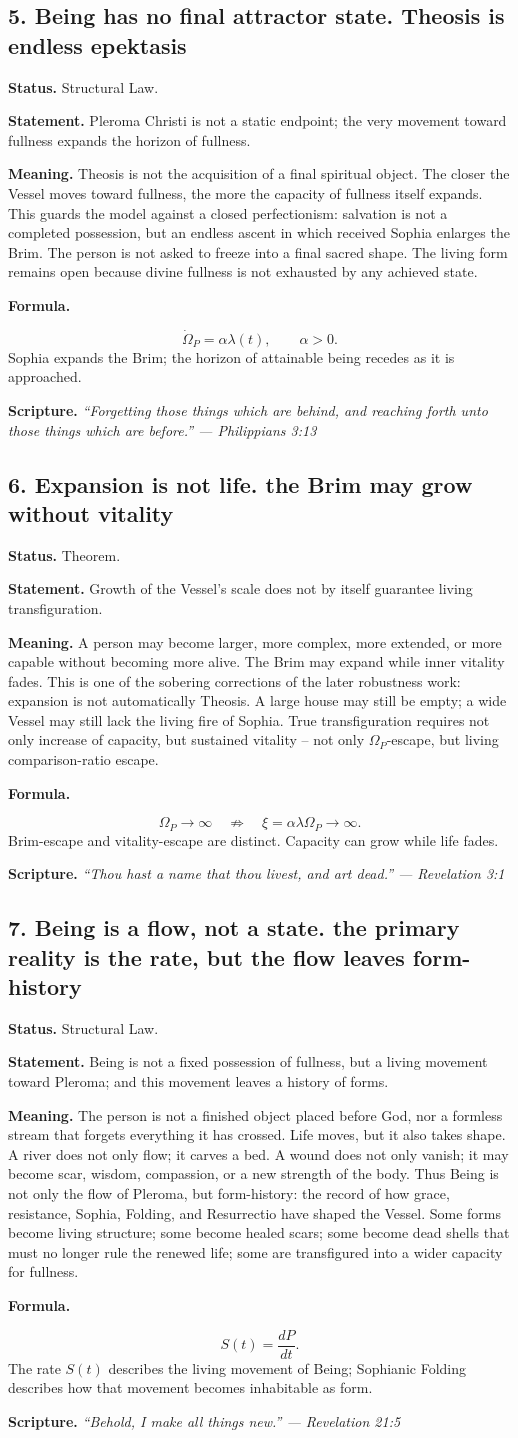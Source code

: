 \documentclass[11pt]{article}
\newcommand{\Op}{\Omega_P}
\newcommand{\thesis}[2]{%
  \subsection*{#1. #2}%
}
\newcommand{\status}[1]{\textbf{Status.} #1\par}
\newcommand{\statement}[1]{\textbf{Statement.} #1\par}
\newcommand{\explain}[1]{\textbf{Meaning.} #1\par}
\newcommand{\formula}[1]{\textbf{Formula.}\par #1\par}
\newcommand{\scripture}[2]{\textbf{Scripture.} {\small\itshape ``#1'' --- #2}\par}
\begin{document}
\thesis{5}{Being has no final attractor state. Theosis is endless epektasis}
\status{Structural Law.}
\statement{Pleroma Christi is not a static endpoint; the very movement toward fullness expands the horizon of fullness.}
\explain{Theosis is not the acquisition of a final spiritual object. The closer the Vessel moves toward fullness, the more the capacity of fullness itself expands. This guards the model against a closed perfectionism: salvation is not a completed possession, but an endless ascent in which received Sophia enlarges the Brim. The person is not asked to freeze into a final sacred shape. The living form remains open because divine fullness is not exhausted by any achieved state.}
\formula{\[
  \dot\Op=\alpha\lambda(t),\qquad \alpha>0.
\]
Sophia expands the Brim; the horizon of attainable being recedes as it is approached.}
\scripture{Forgetting those things which are behind, and reaching forth unto those things which are before.}{Philippians 3:13}


\thesis{6}{Expansion is not life. the Brim may grow without vitality}
\status{Theorem.}
\statement{Growth of the Vessel's scale does not by itself guarantee living transfiguration.}
\explain{A person may become larger, more complex, more extended, or more capable without becoming more alive. The Brim may expand while inner vitality fades. This is one of the sobering corrections of the later robustness work: expansion is not automatically Theosis. A large house may still be empty; a wide Vessel may still lack the living fire of Sophia. True transfiguration requires not only increase of capacity, but sustained vitality -- not only \(\Op\)-escape, but living comparison-ratio escape.}
\formula{\[
  \Op\to\infty
  \quad\not\Longrightarrow\quad
  \xi=\alpha\lambda\Op\to\infty.
\]
Brim-escape and vitality-escape are distinct. Capacity can grow while life fades.}
\scripture{Thou hast a name that thou livest, and art dead.}{Revelation 3:1}

\thesis{7}{Being is a flow, not a state. the primary reality is the rate, but the flow leaves form-history}
\status{Structural Law.}
\statement{Being is not a fixed possession of fullness, but a living movement toward Pleroma; and this movement leaves a history of forms.}
\explain{The person is not a finished object placed before God, nor a formless stream that forgets everything it has crossed. Life moves, but it also takes shape. A river does not only flow; it carves a bed. A wound does not only vanish; it may become scar, wisdom, compassion, or a new strength of the body. Thus Being is not only the flow of Pleroma, but form-history: the record of how grace, resistance, Sophia, Folding, and Resurrectio have shaped the Vessel. Some forms become living structure; some become healed scars; some become dead shells that must no longer rule the renewed life; some are transfigured into a wider capacity for fullness.}
\formula{\[
  S(t)=\frac{dP}{dt}.
\]
The rate \(S(t)\) describes the living movement of Being; Sophianic Folding describes how that movement becomes inhabitable as form.}
\scripture{Behold, I make all things new.}{Revelation 21:5}
\end{document}
